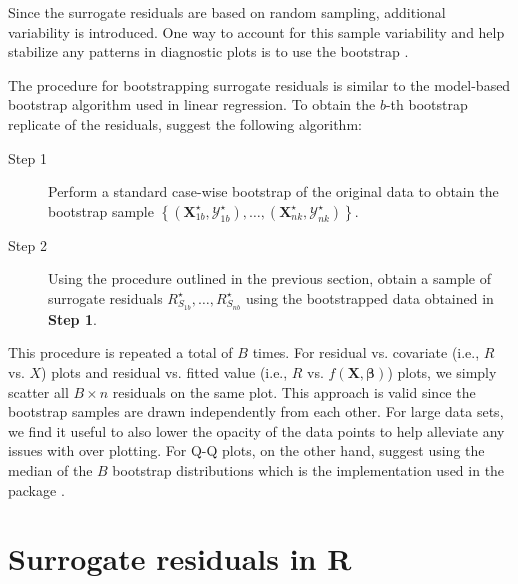 Since the surrogate residuals are based on random sampling, additional variability is introduced. One way to account for this sample variability and help stabilize any patterns in diagnostic plots is to use the bootstrap \citep{efron-another-1979}.

The procedure for bootstrapping surrogate residuals is similar to the model-based bootstrap algorithm used in linear regression. To obtain the $b$-th bootstrap replicate of the residuals, \citet{residuals-liu-2017} suggest the following algorithm:
\begin{description}
  \item[Step 1] Perform a standard case-wise bootstrap of the original data to obtain the bootstrap sample $\left\{\left(\boldsymbol{X}_{1b}^\star, \mathcal{Y}_{1b}^\star\right), \dots, \left(\boldsymbol{X}_{ nk}^\star, \mathcal{Y}_{nk}^\star\right)\right\}$.
  \item[Step 2] Using the procedure outlined in the previous section, obtain a sample of surrogate residuals $R_{S_{1b}}^\star, \dots, R_{S_{nb}}^\star$ using the bootstrapped data obtained in \textbf{Step 1}.
\end{description}

This procedure is repeated a total of $B$ times. For residual vs. covariate (i.e., $R$ vs. $X$) plots and residual vs. fitted value (i.e., $R$ vs. $f\left(\boldsymbol{X}, \boldsymbol{\beta}\right)$) plots, we simply scatter all $B \times n$ residuals on the same plot. This approach is valid since the bootstrap samples are drawn independently from each other. For large data sets, we find it useful to also lower the opacity of the data points to help alleviate any issues with over plotting. For Q-Q plots, on the other hand, \citet{residuals-liu-2017} suggest using the median of the $B$ bootstrap distributions which is the implementation used in the  package \citep{pkg-sure}.


\section{Surrogate residuals in R}

